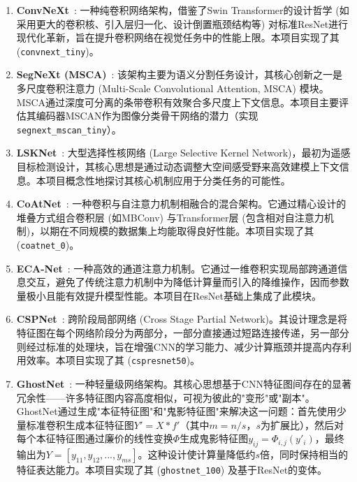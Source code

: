 \documentclass[a4paper]{article}
\begin{document}
\begin{enumerate}
    \item \textbf{ConvNeXt}~\cite{liu2022convnet}: 一种纯卷积网络架构，借鉴了Swin Transformer的设计哲学 (如采用更大的卷积核、引入层归一化、设计倒置瓶颈结构等) 对标准ResNet进行现代化革新，旨在提升卷积网络在视觉任务中的性能上限。本项目实现了其 (\texttt{convnext\_tiny})。
    
    \item \textbf{SegNeXt (MSCA)}~\cite{guo2022segnext}: 该架构主要为语义分割任务设计，其核心创新之一是多尺度卷积注意力 (Multi-Scale Convolutional Attention, MSCA) 模块。MSCA通过深度可分离的条带卷积有效聚合多尺度上下文信息。本项目主要评估其编码器MSCAN作为图像分类骨干网络的潜力（实现 \texttt{segnext\_mscan\_tiny}）。
    
    \item \textbf{LSKNet}~\cite{li2023large}: 大型选择性核网络 (Large Selective Kernel Network)，最初为遥感目标检测设计，其核心思想是通过动态调整大空间感受野来高效建模上下文信息。本项目概念性地探讨其核心机制应用于分类任务的可能性。
    
    \item \textbf{CoAtNet}~\cite{dai2021coatnet}: 一种卷积与自注意力机制相融合的混合架构。它通过精心设计的堆叠方式组合卷积层 (如MBConv) 与Transformer层 (包含相对自注意力机制)，以期在不同规模的数据集上均能取得良好性能。本项目实现了其 (\texttt{coatnet\_0})。
    
    \item \textbf{ECA-Net}~\cite{wang2020ecanet}: 一种高效的通道注意力机制。它通过一维卷积实现局部跨通道信息交互，避免了传统注意力机制中为降低计算量而引入的降维操作，因而参数量极小且能有效提升模型性能。本项目在ResNet基础上集成了此模块。
    
    \item \textbf{CSPNet}~\cite{wang2020cspnet}: 跨阶段局部网络 (Cross Stage Partial Network)。其设计理念是将特征图在每个网络阶段分为两部分，一部分直接通过短路连接传递，另一部分则经过标准的处理块，旨在增强CNN的学习能力、减少计算瓶颈并提高内存利用效率。本项目实现了其 (\texttt{cspresnet50})。
    
    \item \textbf{GhostNet}~\cite{han2020ghostnet}: 一种轻量级网络架构。其核心思想基于CNN特征图间存在的显著冗余性——许多特征图内容高度相似，可视为彼此的"变形"或"副本"。GhostNet通过生成"本征特征图"和"鬼影特征图"来解决这一问题：首先使用少量标准卷积生成本征特征图\( Y' = X * f' \)（其中\( m = n/s \)，\(s\)为扩展比），然后对每个本征特征图通过廉价的线性变换\( \Phi \)生成鬼影特征图\( y_{ij} = \Phi_{i,j}(y'_i) \)，最终输出为\( Y = [y_{11}, y_{12}, ..., y_{ms}] \)。这种设计使计算量降低约\(s\)倍，同时保持相当的特征表达能力。本项目实现了其 (\texttt{ghostnet\_100}) 及基于ResNet的变体。
    

\end{enumerate}
\end{document}
